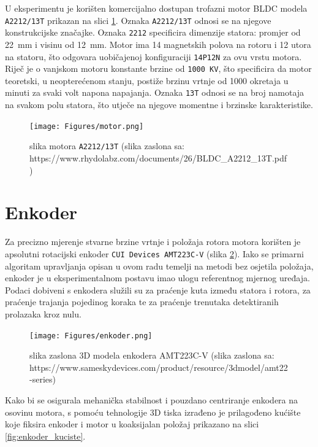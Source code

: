 \documentclass[diplomskirad]{fer}
\begin{document}
U eksperimentu je korišten komercijalno dostupan trofazni motor BLDC modela
\texttt{A2212/13T} prikazan na slici \ref{fig:motor}. Oznaka \texttt{A2212/13T}
odnosi se na njegove konstrukcijske značajke. Oznaka \texttt{2212} specificira
dimenzije statora: promjer od \SI{22}{\milli\metre} i visinu od
\SI{12}{\milli\metre}. Motor ima 14 magnetskih polova na rotoru i 12 utora na
statoru, što odgovara uobičajenoj konfiguraciji \texttt{14P12N} za ovu vrstu
motora. Riječ je o vanjskom motoru konstante brzine od \texttt{1000 KV}, što
specificira da motor teoretski, u neopterećenom stanju, postiže brzinu vrtnje
od \num{1000} okretaja u minuti za svaki volt napona napajanja. Oznaka
\texttt{13T} odnosi se na broj namotaja na svakom polu statora, što utječe na
njegove momentne i brzinske karakteristike.
\begin{figure}[h!]
	\centering
	\texttt{[image: Figures/motor.png]}
	\caption{slika motora \texttt{A2212/13T} (slika zaslona sa: https://www.rhydolabz.com/documents/26/BLDC\_A2212\_13T.pdf)}
	\label{fig:motor}
\end{figure}

\section{Enkoder}
\label{sec:enkoder}

Za precizno mjerenje stvarne brzine vrtnje i položaja rotora motora korišten je
apsolutni rotacijski enkoder \texttt{CUI Devices AMT223C-V} (slika
\ref{fig:enkoder}). Iako se primarni algoritam upravljanja opisan u ovom radu
temelji na metodi bez osjetila položaja, enkoder je u eksperimentalnom postavu
imao ulogu referentnog mjernog uređaja. Podaci dobiveni s enkodera služili su
za praćenje kuta između statora i rotora, za praćenje trajanja pojedinog koraka
te za praćenje trenutaka detektiranih prolazaka kroz nulu.

\begin{figure}[h!]
	\centering
	\texttt{[image: Figures/enkoder.png]}
	\caption{slika zaslona 3D modela enkodera AMT223C-V (slika zaslona sa: https://www.sameskydevices.com/product/resource/3dmodel/amt22-series)}
	\label{fig:enkoder}
\end{figure}

Kako bi se osigurala mehanička stabilnost i pouzdano centriranje enkodera na
osovinu motora, s pomoću tehnologije 3D tiska izrađeno je prilagođeno kućište
koje fiksira enkoder i motor u koaksijalan položaj prikazano na slici
\ref{fig:enkoder_kuciste}.
\end{document}

